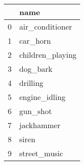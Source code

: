 \begin{tabular}{ll}
\toprule
{} &              name \\
\midrule
0 &   air\_conditioner \\
1 &          car\_horn \\
2 &  children\_playing \\
3 &          dog\_bark \\
4 &          drilling \\
5 &     engine\_idling \\
6 &          gun\_shot \\
7 &        jackhammer \\
8 &             siren \\
9 &      street\_music \\
\bottomrule
\end{tabular}

